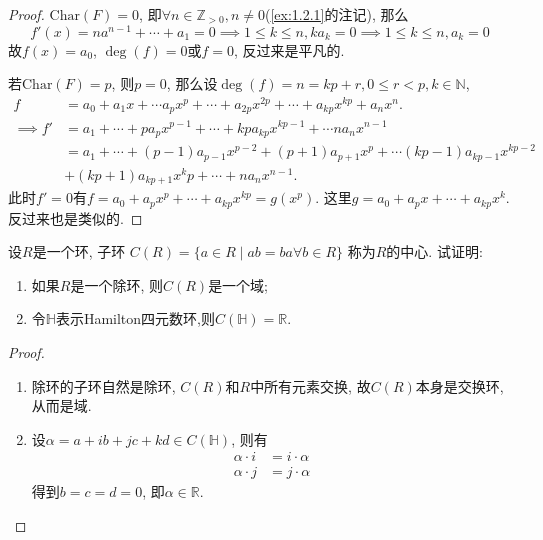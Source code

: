 \begin{proof}
    $\mathrm{Char}(F) = 0$, 即$\forall n \in \mathbb{Z}_{>0}, n \neq 0$(\ref{ex:1.2.1}的注记), 那么
\[
    f'(x) = na^{n - 1} + \cdots + a_1 = 0 \implies 1 \leqslant k \leqslant n, ka_k = 0 \implies 1 \leqslant k \leqslant n, a_k = 0
\]
故$f(x) = a_0$, $\deg(f) = 0$或$f = 0$, 反过来是平凡的.

    若$\mathrm{Char}(F) = p$, 则$p = 0$, 那么设$\deg(f) = n = kp + r, 0 \leqslant r < p, k \in \mathbb{N}$,
\[
\begin{aligned}
    f &= a_0 + a_1x + \cdots a_px^p + \cdots + a_{2p}x^{2p} + \cdots + a_{kp}x^{kp} + a_nx^n.\\
    \implies f' &= a_1 + \cdots + pa_px^{p - 1} + \cdots + kpa_{kp}x^{kp - 1} + \cdots na_nx^{n - 1}\\
    &= a_1 + \cdots + (p - 1)a_{p - 1}x^{p - 2} + (p + 1)a_{p + 1}x^p + \cdots (kp - 1)a_{kp - 1}x^{kp - 2}\\
    &+ (kp + 1)a_{kp + 1}x^kp + \cdots + na_nx^{n - 1}.
\end{aligned}
\]
此时$f' = 0$有$f = a_0 + a_px^p + \cdots + a_{kp}x^{kp} = g(x^p)$. 这里$g = a_0 + a_px + \cdots + a_{kp}x^k$. 反过来也是类似的.
\end{proof}

\begin{problem}\label{ex:2.1.11}
    设$R$是一个环, 子环
$C(R) = \{a \in R \mid ab = ba \forall b \in R\}$
称为$R$的中心. 试证明:
\begin{enumerate}[(1)]
    \item 如果$R$是一个除环, 则$C(R)$是一个域;
    \item 令$\mathbb{H}$表示Hamilton四元数环,则$C(\mathbb{H}) = \mathbb{R}$.
\end{enumerate}
\end{problem}

\begin{proof}
    \begin{enumerate}[(1)]
        \item 除环的子环自然是除环, $C(R)$和$R$中所有元素交换, 故$C(R)$本身是交换环, 从而是域.
        \item 设$\alpha = a + ib + jc + kd \in C(\mathbb{H})$, 则有
        \[
        \begin{aligned}
            \alpha \cdot i &= i \cdot \alpha\\
            \alpha \cdot j &= j \cdot \alpha
        \end{aligned}
        \]
        得到$b = c = d = 0$, 即$\alpha \in \mathbb{R}$.
    \end{enumerate}
\end{proof}

